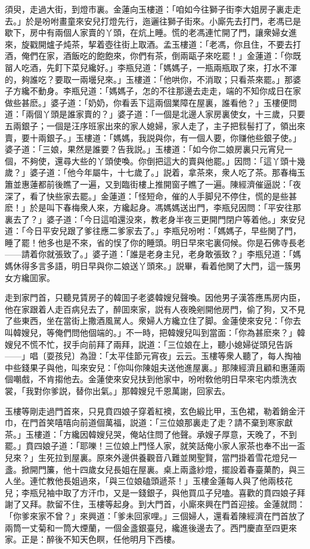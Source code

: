 須臾，走過大街，到燈市裏。金蓮向玉樓道：「咱如今往獅子街李大姐房子裏走走去。」於是吩咐畫童來安兒打燈先行，迤邐往獅子街來。小廝先去打門，老馮已是歇下，房中有兩個人家賣的丫頭，在炕上睡。慌的老馮連忙開了門，讓衆婦女進來，旋戳開爐子炖茶，挈着壺往街上取酒。孟玉樓道：「老馮，你且住，不要去打酒，俺們在家，酒飯吃的飽飽來，你們有茶，倒兩甌子來吃罷！」金蓮道：「你既㽞人吃酒，先飣下菜兒纔好。」李瓶兒道：「媽媽子，一瓶兩瓶取了來，打水不渾的，夠誰吃？要取一兩壜兒來。」玉樓道：「他哄你，不消取；只看茶來罷。」那婆子方纔不動身。李瓶兒道：「媽媽子，怎的不往那邊去走走，端的不知你成日在家做些甚麽。」婆子道：「奶奶，你看丢下這兩個業障在屋裏，誰看他？」玉樓便問道：「兩個丫頭是誰家賣的？」婆子道：「一個是北邊人家房裏使女，十三歲，只要五兩銀子；一個是汪序班家出來的家人媳婦，家人走了，主子把䯼髻打了，領出來賣，要十兩銀子。」玉樓道：「媽媽，我説與你，有一個人要，你赚他些銀子使。」婆子道：「三娘，果然是誰要？告我説。」玉樓道：「如今你二娘房裏只元宵兒一個，不夠使，還尋大些的丫頭使喚。你倒把這大的賣與他罷。」因問：「這丫頭十幾歲？」婆子道：「他今年屬牛，十七歲了。」説着，拿茶來，衆人吃了茶。那春梅玉簫並惠蓮都前後瞧了一遍，又到臨街樓上推開窗子瞧了一遍。陳經濟催逼説：「夜深了，看了快些家去罷。」金蓮道：「怪短命，催的人手脚兒不停住，慌的是些甚麽！」於是叫下春梅衆人來，方纔起身。馮媽媽送出門，李瓶兒因問：「平安往那裏去了？」婆子道：「今日這咱還没來，教老身半夜三更開門閉户等着他。」來安兒道：「今日平安兒跟了爹往應二爹家去了。」李瓶兒吩咐：「媽媽子，早些関了門，睡了罷！他多也是不來，省的悮了你的睡頭。明日早來宅裏伺候。你是石佛寺長老——請着你就張致了。」婆子道：「誰是老身主兒，老身敢張致？」李瓶兒道：「媽媽休得多言多語，明日早與你二娘送丫頭來。」説畢，看着他関了大門，這一簇男女方纔囬家。

走到家門首，只聽見賃房子的韓囬子老婆韓嫂兒聲喚。因他男子漢答應馬房内臣，他在家跟着人走百病兒去了，醉囬來家，説有人夜晚剜開他房門，偷了狗，又不見了些東西，坐在當街上撒酒風駡人。衆婦人方纔立住了脚。金蓮使來安兒：「你去叫韓嫂兒，等俺們問他個端的。」不一時，把韓嫂兒叫到當面：「你為甚麽來？」韓嫂兒不慌不忙，扠手向前拜了兩拜，説道：「三位娘在上，聽小媳婦従頭兒告訴——」唱〔耍孩兒〕為證：「太平佳節元宵夜」云云。玉樓等衆人聽了，每人掏袖中些錢果子與他，叫來安兒：「你叫你陳姐夫送他進屋裏。」那陳經濟且顧和惠蓮兩個嘲戲，不肯搊他去。金蓮使來安兒扶到他家中，吩咐敎他明日早來宅内漿洗衣裳，「我對你爹説，替你出氣。」那韓嫂兒千恩萬謝，回家去。

玉樓等剛走過門首來，只見賁四娘子穿着紅襖，玄色緞比甲，玉色裙，勒着銷金汗巾，在門首笑嘻嘻向前道個萬福，説道：「三位娘那裏走了走？請不棄到寒家獻茶。」玉樓道：「方纔因韓嫂兒哭，俺站住問了他聲。承嫂子厚意，天晚了，不到罷。」賁四娘子道：「耶嚛！三位娘上門怪人家，就笑話俺小家人家茶也奉不出一盃兒來？」生死拉到屋裏。原來外邊供養觀音八難並関聖賢，當門掛着雪花燈兒一盞。掀開門簾，他十四歲女兒長姐在屋裏。桌上兩盞紗燈，擺設着春臺菓酌，與三人坐。連忙教他長姐過來，「與三位娘磕頭遞茶！」玉樓金蓮每人與了他兩枝花兒；李瓶兒袖中取了方汗巾，又是一錢銀子，與他買瓜子兒嗑。喜歡的賁四娘子拜謝了又拜。款留不住，玉樓等起身。到大門首，小廝來興在門首迎接。金蓮就問：「你爹來家不曾？」來興道：「爹未回家哩。」三個婦人，還看着陳經濟在門首放了兩筒一丈菊和一筒大煙蘭，一個金盞銀臺兒，纔進後邊去了。西門慶直至四更來家。正是：醉後不知天色瞑，任他明月下西樓。

